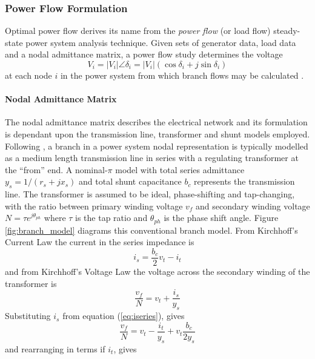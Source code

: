 \subsubsection{Power Flow Formulation}
\label{sec:pf_form}
Optimal power flow derives its name from the \textit{power flow} (or load flow)
steady-state power system analysis technique.  Given sets of generator data,
load data and a nodal admittance matrix, a power flow study determines the
voltage
\begin{equation}
V_i = \vert V_i \vert \angle\delta_i = \vert
V_i\vert(\cos\delta_i + j\sin\delta_i)
\end{equation}
at each node $i$ in the power system from which branch flows may be calculated
\cite{grainger:psa}.

\paragraph{Nodal Admittance Matrix}
The nodal admittance matrix describes the electrical network and its
formulation is dependant upon the transmission line, transformer and shunt
models employed.  Following , a branch in a power
system nodal representation is typically modelled as a medium length
transmission line in series with a regulating transformer at the ``from'' end.
A nominal-$\pi$ model with total series admittance $y_s = 1/(r_s+jx_s)$ and
total shunt capacitance $b_c$ represents the transmission line.  The
transformer is assumed to be ideal, phase-shifting and tap-changing, with the
ratio between primary winding voltage $v_{f}$ and secondary winding voltage
$N = \tau e^{j\theta_{ph}}$ where $\tau$ is the tap ratio and $\theta_{ph}$ is
the phase shift angle. Figure \ref{fig:branch_model} diagrams this
conventional branch model.  From Kirchhoff's Current Law the current in the
series impedance is
\begin{equation}
\label{eq:iseries}
i_s = \frac{b_c}{2}v_t - i_t
\end{equation}
and from Kirchhoff's Voltage Law the voltage across the secondary winding of
the transformer is
\begin{equation}
\frac{v_{f}}{N} = v_t + \frac{i_s}{y_s}
\end{equation}
Substituting $i_s$ from equation (\ref{eq:iseries}), gives
\begin{equation}
\label{eq:vfrom}
\frac{v_{f}}{N} = v_t - \frac{i_t}{y_s} + v_t\frac{b_c}{2y_s}
\end{equation}
and rearranging in terms if $i_t$, gives
